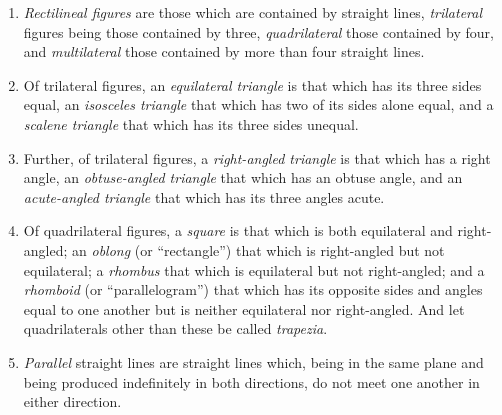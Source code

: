 \documentclass[12pt, twoside]{memoir}
\begin{document}
\begin{enumerate}
        \iftoggle{defpics}{~\hfill\drawCurrentPicture\hfill~}{}
    \item \emph{Rectilineal figures} are those which are contained by straight lines, \emph{trilateral} figures being those contained by three, \emph{quadrilateral} those contained by four, and \emph{multilateral} those contained by more than four straight lines.\label{Def:I.XIX}
    \item Of trilateral figures, an \emph{equilateral triangle} is that which has its three sides equal, an \emph{isosceles triangle} that which has two of its sides alone equal, and a \emph{scalene triangle} that which has its three sides unequal.\label{Def:I.XX}
    \item Further, of trilateral figures, a \emph{right-angled triangle} is that which has a right angle, an \emph{obtuse-angled triangle} that which has an obtuse angle, and an \emph{acute-angled triangle} that which has its three angles acute.\label{Def:I.XXI}
    \item Of quadrilateral figures, a \emph{square} is that which is both equilateral and right-angled; an \emph{oblong} (or ``rectangle'') that which is right-angled but not equilateral; a \emph{rhombus} that which is equilateral but not right-angled; and a \emph{rhomboid} (or ``parallelogram'') that which has its opposite sides and angles equal to one another but is neither equilateral nor right-angled. And let quadrilaterals other than these be called \emph{trapezia}.\label{Def:I.XXII}
    \item \emph{Parallel} straight lines are straight lines which, being in the same plane and being produced indefinitely in both directions, do not meet one another in either direction.\label{Def:I.XXIII}
\end{enumerate}
\end{document}
